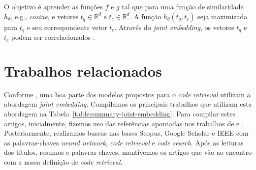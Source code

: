 O objetivo é aprender as funções $f$ e $g$ tal que para uma função de similaridade $h_{\theta}$, e.g., \textit{cosine}, e vetores $t_{q} \in \mathbb{R}^{d}$ e $t_{c} \in \mathbb{R}^{d}$. A função  $h_{\theta}(t_{q}, t_{c})$ seja maximizada para $t_{q}$ e seu correspondente vetor $t_{c}$.
Através do \textit{joint embedding}, os vetores $t_{q}$ e $t_{c}$ podem ser correlacionados \citep{Gu-deep-code-search:2018, cambronero-deep-learning-code-search:2019}.

    

\section{Trabalhos relacionados}\label{sec:code-retrieval-trabalhos-relacionados}

Conforme \cite{cambronero-deep-learning-code-search:2019}, uma boa parte dos modelos propostos para o \textit{code retrieval} utilizam a abordagem \textit{joint embedding}. Compilamos os principais trabalhos que utilizam esta abordagem na Tabela~\ref{table:summary-joint-embedding}. Para compilar estes artigos, inicialmente, fizemos uso das referências apontadas nos  trabalhos de \citeauthor{Allamanis:2018:SML} e \citeauthor{yao-2018}. Posteriormente, realizamos buscas nas bases Scopus, Google Scholar e IEEE com as palavras-chaves \textit{neural network}, \textit{code retrieval} e \textit{code search}. Após as leituras dos títulos, resumos e palavras-chaves, mantivemos os artigos que vão ao encontro com a nossa definição de \textit{code retrieval}.

